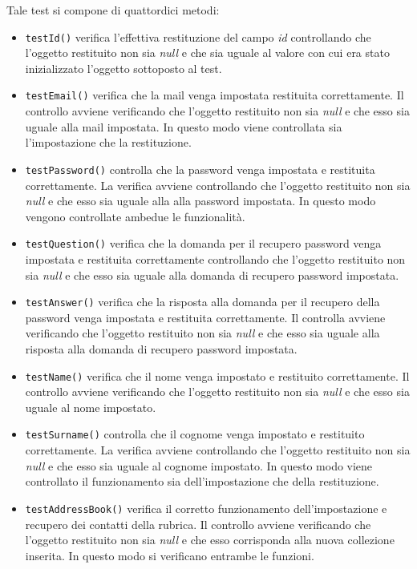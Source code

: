 \begin{itemize}
Tale test si compone di quattordici metodi:
\begin{itemize}
\item \texttt{testId()} 
verifica l'effettiva restituzione del campo \textit{id} controllando che l'oggetto restituito non sia \textit{null} e che sia uguale al valore con cui era stato inizializzato l'oggetto sottoposto al test.
\item \texttt{testEmail()} verifica che la mail venga impostata restituita correttamente. Il controllo avviene verificando che l'oggetto restituito non sia \textit{null} e che esso sia uguale alla mail impostata. In questo modo viene controllata sia l'impostazione che la restituzione. 
\item \texttt{testPassword()} controlla che la password venga impostata e restituita correttamente. La verifica avviene controllando che l'oggetto restituito non sia \textit{null} e che esso sia uguale alla alla password impostata. In questo modo vengono controllate ambedue le funzionalità.
\item \texttt{testQuestion()} verifica che la domanda per il recupero password venga impostata e restituita correttamente controllando che l'oggetto restituito non sia \textit{null} e che esso sia uguale alla domanda di recupero password impostata.
\item \texttt{testAnswer()} verifica che la risposta alla domanda per il recupero della password venga impostata e restituita correttamente. Il controlla avviene verificando che l'oggetto restituito non sia \textit{null} e che esso sia uguale alla risposta alla domanda di recupero password impostata. 
\item \texttt{testName()} verifica che il nome venga impostato e restituito correttamente. Il controllo avviene verificando che l'oggetto restituito non sia \textit{null} e che esso sia uguale al nome impostato.
\item \texttt{testSurname()} controlla che il cognome venga impostato e restituito correttamente. La verifica avviene controllando che l'oggetto restituito non sia \textit{null} e che esso sia uguale al cognome impostato. In questo modo viene controllato il funzionamento sia dell'impostazione che della restituzione.
\item \texttt{testAddressBook()} verifica il corretto funzionamento dell'impostazione e recupero dei contatti della rubrica.
Il controllo avviene verificando che l'oggetto restituito non sia \textit{null} e che esso corrisponda alla nuova collezione inserita.
In questo modo si verificano entrambe le funzioni.


\end{itemize}
\end{itemize}
